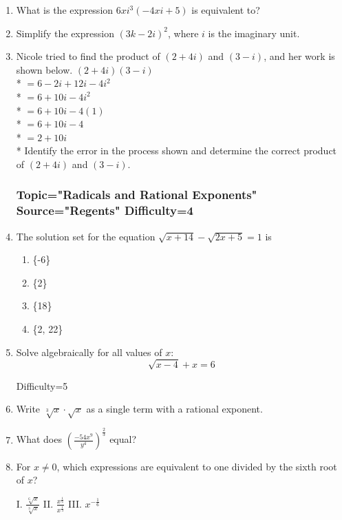 \documentclass[12pt, oneside]{article}
\begin{document}
\begin{enumerate}
\item What is the expression $6xi^3(-4xi+5)$ is equivalent to?  %

\item Simplify the expression $(3k - 2i)^2$, where $i$ is the imaginary unit. %

\item Nicole tried to find the product of $(2+ 4i)$ and $(3 - i)$, and her work is shown below.
$(2 + 4i)(3 - i)$\\*
$=6 - 2i + 12i - 4i^2$\\*
$=6 + 10i - 4i^2$\\*
$=6 + 10i - 4(1)$\\*
$=6 + 10i - 4$\\*
$=2 + 10i$\\*
Identify the error in the process shown and determine the correct product of $(2+ 4i)$ and $(3 - i)$.%

\subsubsection*{Topic="Radicals and Rational Exponents"\\
Source="Regents" 
Difficulty=4}

\item The solution set for the equation $\sqrt{x+14}- \sqrt{2x+5}= 1$ is
\begin{enumerate}
    \item \{-6\}
    \item \{2\}
    \item \{18\}
    \item \{2, 22\}
\end{enumerate} %

\item Solve algebraically for all values of $x$: 
\[\sqrt{x-4}+x=6\] %


Difficulty=5
\item Write $\sqrt[3]x \cdot \sqrt{x}$ as a single term with a rational exponent. %

\item What does $\displaystyle \left( \frac{-54x^9}{y^4} \right)^\frac{2}{3}$ equal? %

\item For $x \neq 0$, which expressions are equivalent to one divided by the sixth root of $x$?
\begin{center}
    I. $\frac{\sqrt[6]{x}}{\sqrt[3]{x}}$ \qquad  II. $\displaystyle \frac{x^\frac{1}{6}}{x^\frac{1}{3}}$  \qquad  III. $x^{-\frac{1}{6}}$
\end{center}



\end{enumerate}
\end{document}
